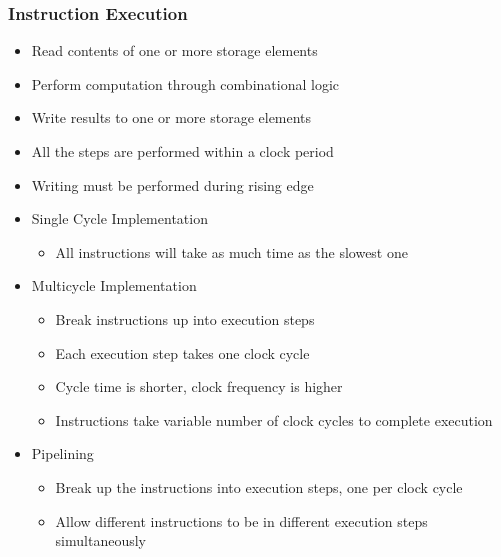 \documentclass[10pt, portrait]{article}
\begin{document}
\begin{multicols*}{2}
\subsubsection{Instruction Execution}
\begin{itemize}
    \item Read contents of one or more storage elements
    \item Perform computation through combinational logic
    \item Write results to one or more storage elements
    \item All the steps are performed within a clock period
    \item Writing must be performed during rising edge
    \item Single Cycle Implementation
    \begin{itemize}
        \item All instructions will take as much time as the slowest one
    \end{itemize}
    \item Multicycle Implementation
    \begin{itemize}
        \item Break instructions up into execution steps
        \item Each execution step takes one clock cycle
        \item Cycle time is shorter, clock frequency is higher
        \item Instructions take variable number of clock cycles to complete execution
    \end{itemize}
    \item Pipelining
    \begin{itemize}
        \item Break up the instructions into execution steps, one per clock cycle
        \item Allow different instructions to be in different execution steps simultaneously
    \end{itemize}
\end{itemize}

\end{multicols*}
\end{document}
